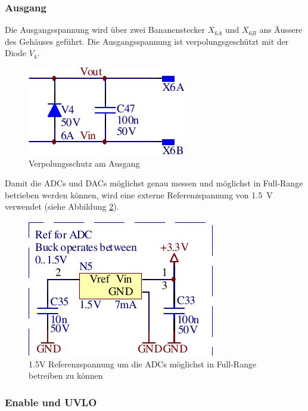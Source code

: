 \subsubsection{Ausgang}

Die Ausgangsspannung wird \"uber zwei  Bananenstecker  $X_{6A}$ und $X_{6B}$ ans
\"Aussere    des    Geh\"auses     gef\"uhrt.     Die    Ausgangsspannung    ist
verpolungsgesch\"utzt mit der Diode $V_4$.

\begin{figure}[th!]
    \center
    \includegraphics[width=.35\textwidth]{images/circuit/output-connectors.pdf}
    \caption{Verpolungsschutz am Ausgang}
    \label{fig:circuit:output}
\end{figure}

Damit die ADCs und DACs  m\"oglichst  genau messen und m\"oglichst in Full-Range
betrieben    werden   k\"onnen,   wird   eine   externe   Referenzspannung   von
\SI{1.5}{\volt}    verwendet     (siehe    Abbildung    \ref{fig:circuit:vref}).

\begin{figure}[th!]
    \center
    \includegraphics[width=.4\textwidth]{images/circuit/vref.pdf}
    \caption{1.5V Referenzspannung um die ADCs m\"oglichst in Full-Range betreiben zu k\"onnen}
    \label{fig:circuit:vref}
\end{figure}

\subsubsection{Enable und UVLO}

